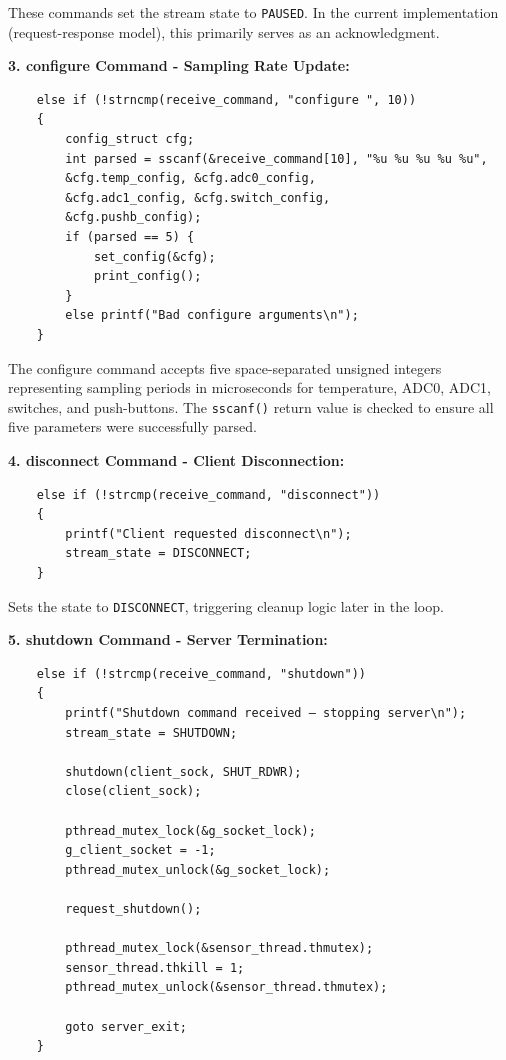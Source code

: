 These commands set the stream state to \texttt{PAUSED}. In the current implementation (request-response model), this primarily serves as an acknowledgment.

\textbf{3. configure Command - Sampling Rate Update:}

\begin{verbatim}
	else if (!strncmp(receive_command, "configure ", 10))
	{
		config_struct cfg;
		int parsed = sscanf(&receive_command[10], "%u %u %u %u %u",
		&cfg.temp_config, &cfg.adc0_config,
		&cfg.adc1_config, &cfg.switch_config,
		&cfg.pushb_config);
		if (parsed == 5) { 
			set_config(&cfg); 
			print_config(); 
		}
		else printf("Bad configure arguments\n");
	}
\end{verbatim}

The configure command accepts five space-separated unsigned integers representing sampling periods in microseconds for temperature, ADC0, ADC1, switches, and push-buttons. The \texttt{sscanf()} return value is checked to ensure all five parameters were successfully parsed.

\textbf{4. disconnect Command - Client Disconnection:}

\begin{verbatim}
	else if (!strcmp(receive_command, "disconnect"))
	{
		printf("Client requested disconnect\n");
		stream_state = DISCONNECT;
	}
\end{verbatim}

Sets the state to \texttt{DISCONNECT}, triggering cleanup logic later in the loop.

\textbf{5. shutdown Command - Server Termination:}

\begin{verbatim}
	else if (!strcmp(receive_command, "shutdown"))
	{
		printf("Shutdown command received — stopping server\n");
		stream_state = SHUTDOWN;
		
		shutdown(client_sock, SHUT_RDWR);
		close(client_sock);
		
		pthread_mutex_lock(&g_socket_lock);
		g_client_socket = -1;
		pthread_mutex_unlock(&g_socket_lock);
		
		request_shutdown();
		
		pthread_mutex_lock(&sensor_thread.thmutex);
		sensor_thread.thkill = 1;
		pthread_mutex_unlock(&sensor_thread.thmutex);
		
		goto server_exit;
	}
\end{verbatim}


